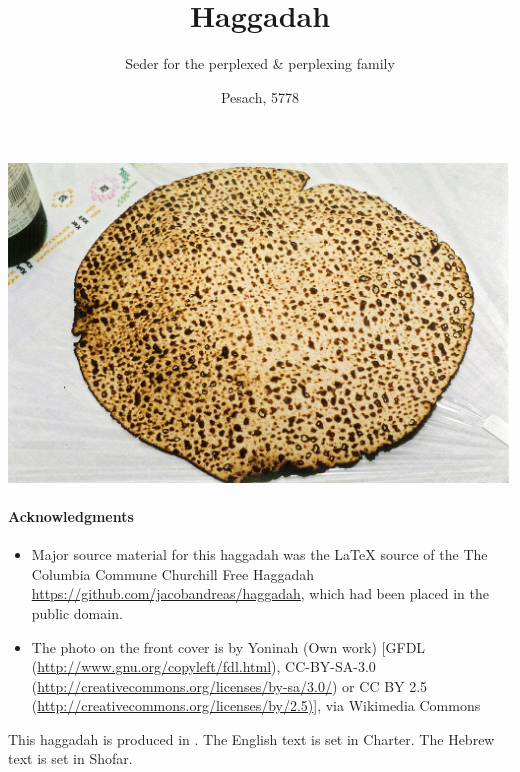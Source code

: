 \documentclass[extrafontsizes,twoside,17pt,a4paper,openany]{memoir}
\title{\vspace*{-4cm}Haggadah}
\author{\vspace*{-1cm}Seder for the perplexed \& perplexing family}
\date{Pesach, 5778}
\begin{document}
\frontmatter
{}\afterpage{\restorepagecolor}
\maketitle
\thispagestyle{empty}



\noindent\hspace*{-5cm}
\vspace*{-3cm}
\includegraphics[width=232mm]{figs/matzo.jpg}
\thispagestyle{empty}



\newpage

\phantom{Deliberately blank}
\thispagestyle{empty}

\newpage
\setcounter{page}{1}
\maketitle

\newpage
\vfill\phantom{Hello}\vfill

\vfill
{\small
\paragraph*{Acknowledgments}

\begin{itemize}
\item Major  source material for this haggadah was the {\LaTeX}
  source of the The Columbia Commune Churchill Free Haggadah
  \url{https://github.com/jacobandreas/haggadah}, which had been
  placed in the public domain.
\item The photo on the
  front cover is by Yoninah (Own work) [GFDL
  (\url{http://www.gnu.org/copyleft/fdl.html}), CC-BY-SA-3.0
  (\url{http://creativecommons.org/licenses/by-sa/3.0/}) or CC BY 2.5
  (\url{http://creativecommons.org/licenses/by/2.5)}], via Wikimedia
  Commons
\end{itemize}

\vfill
\noindent
This  haggadah is produced in {\XeLaTeX}. The English text is
set in Charter. The Hebrew text is set in Shofar.
}
\newpage
\end{document}
